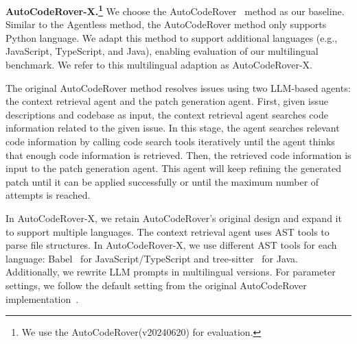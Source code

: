 \textbf{AutoCodeRover-X.\footnote{We use the AutoCodeRover(v20240620) for evaluation.}} We choose the AutoCodeRover~\cite{zhang2024autocoderover} 
method as our baseline. Similar to the Agentless method, the AutoCodeRover method only supports Python language. We adapt this method to support additional languages (e.g., JavaScript, TypeScript, and Java), enabling evaluation of our multilingual benchmark. We refer to this multilingual adaption as AutoCodeRover-X.

The original AutoCodeRover method resolves issues using two LLM-based agents: the context retrieval agent and the patch generation agent. First, given issue descriptions and codebase as input, the context retrieval agent searches code information related to the given issue. In this stage, the agent searches relevant code information by calling code search tools iteratively until the agent thinks that enough code information is retrieved. Then, the retrieved code information is input to the patch generation agent. This agent will keep refining the generated patch until it can be applied successfully or until the maximum number of attempts is reached.

In AutoCodeRover-X, we retain AutoCodeRover's original design and expand it to support multiple languages. The context retrieval agent uses AST tools to parse file structures. In AutoCodeRover-X, we use different AST tools for each language: Babel~\cite{babel} for JavaScript/TypeScript and tree-sitter~\cite{tree-sitter} for Java. Additionally, we rewrite LLM prompts in multilingual versions. For parameter settings, we follow the default setting from the original AutoCodeRover implementation~\cite{auto-coderover-config}.





